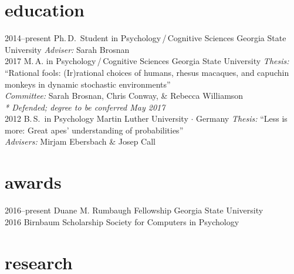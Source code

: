 \documentclass[]{friggeri-cv}
\begin{document}
\section{education}

\begin{entrylist}
  \entry
    {2014--present}
    {Ph.\,D.~Student in Psychology\,/\,Cognitive Sciences}
    {Georgia State University}
    {\emph{Adviser:} Sarah Brosnan\\[-.3cm]}
 \entry
   {2017}
   {M.\,A. in Psychology\,/\,Cognitive Sciences}
   {Georgia State University}
   {\emph{Thesis:} ``Rational fools: (Ir)rational choices of humans, rhesus macaques, and capuchin monkeys in dynamic stochastic environments''\\
   \emph{Committee:} Sarah Brosnan, Chris Conway, \& Rebecca Williamson\\
   {\small{} \emph{* Defended; degree to be conferred May 2017}}\\[-.3cm]}
  \entry
    {2012}
    {B.\,S.~in Psychology}
    {Martin Luther University $\cdot$ Germany}
    {\emph{Thesis:} ``Less is more: Great apes' understanding of probabilities''\\
    \emph{Advisers:} Mirjam Ebersbach \& Josep Call}
\end{entrylist}


\section{awards}

\begin{entrylist}
  \entry
    {2016--present}
    {Duane M. Rumbaugh Fellowship}
    {Georgia State University}
    {\\[-.7cm]}
  \entry
    {2016}
    {Birnbaum Scholarship}
    {Society for Computers in Psychology}
    {}
\end{entrylist}

\section{research}
\end{document}
